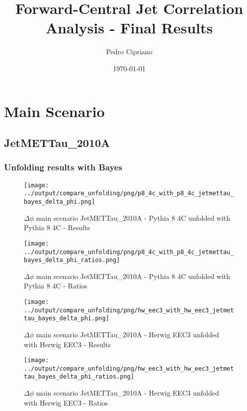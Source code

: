 \documentclass[11pt]{book}
\begin{document}
         
 
 \author{Pedro Cipriano}
 \date{\today}
 \title{Forward-Central Jet Correlation Analysis - Final Results}

\maketitle

\tableofcontents

\newpage
\chapter{Main Scenario}
\section{JetMETTau\_2010A}
\subsection{Unfolding results with Bayes}

\begin{figure}[ht]
\centering
\texttt{[image: ../output/compare\_unfolding/png/p8\_4c\_with\_p8\_4c\_jetmettau\_bayes\_delta\_phi.png]}
\caption{$\Delta\phi$ main scenario JetMETTau\_2010A - Pythia 8 4C unfolded with Pythia 8 4C - Results}
\label{p8_p8_jetmettau_delta_phi_a}
\end{figure}

\begin{figure}[ht]
\centering
\texttt{[image: ../output/compare\_unfolding/png/p8\_4c\_with\_p8\_4c\_jetmettau\_bayes\_delta\_phi\_ratios.png]}
\caption{$\Delta\phi$ main scenario JetMETTau\_2010A - Pythia 8 4C unfolded with Pythia 8 4C - Ratios}
\label{p8_p8_jetmettau_delta_phi_b}
\end{figure}

\begin{figure}[ht]
\centering
\texttt{[image: ../output/compare\_unfolding/png/hw\_eec3\_with\_hw\_eec3\_jetmettau\_bayes\_delta\_phi.png]}
\caption{$\Delta\phi$ main scenario JetMETTau\_2010A - Herwig EEC3 unfolded with Herwig EEC3 - Results}
\label{hw_eec3_hw_eec3_jetmettau_delta_phi_a}
\end{figure}

\begin{figure}[ht]
\centering
\texttt{[image: ../output/compare\_unfolding/png/hw\_eec3\_with\_hw\_eec3\_jetmettau\_bayes\_delta\_phi\_ratios.png]}
\caption{$\Delta\phi$ main scenario JetMETTau\_2010A - Herwig EEC3 unfolded with Herwig EEC3 - Ratios}
\label{hw_eec3_jetmettau_delta_phi_b}
\end{figure}
\end{document}
